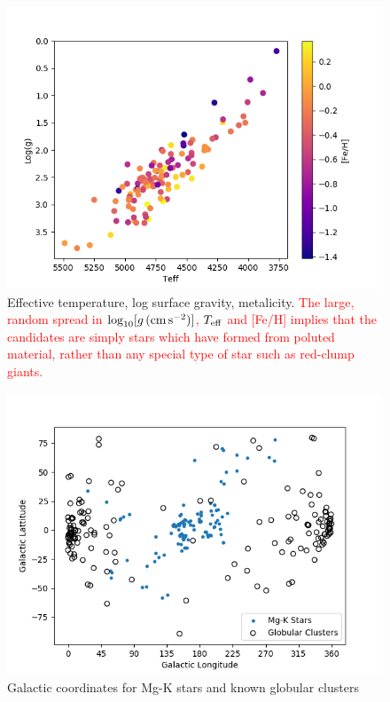 \documentclass[a4paper,fleqn,usenatbib]{mnras}
\newcommand{\todo}[1]{\textcolor{red}{#1}}
\newcommand{\teff}{T_{\rm eff}}
\newcommand{\logg}{\log_{10}[g\,({\rm cm\,s}^{-2})]}
\begin{document}
\begin{figure}
	\includegraphics[width=\columnwidth]{loggteffof113.png}
    \caption{Effective temperature, log surface gravity, metalicity. \todo{The large, random spread in $\logg$, $\teff$ and [Fe/H] implies that the candidates are simply stars which have formed from poluted material, rather than any special type of star such as red-clump giants.}}
    \label{tefflogg}
\end{figure}

\begin{figure}
	\includegraphics[width=\columnwidth]{globclustof113.png}
    \caption{Galactic coordinates for Mg-K stars and known globular clusters}
    \label{galcord}
\end{figure}
\end{document}
